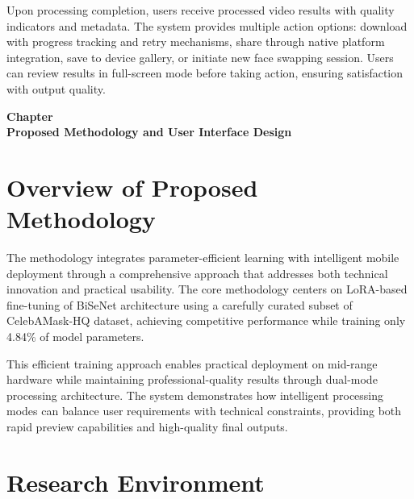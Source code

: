 \documentclass[12pt,a4paper]{report}
\begin{document}
Upon processing completion, users receive processed video results with quality indicators and metadata. The system provides multiple action options: download with progress tracking and retry mechanisms, share through native platform integration, save to device gallery, or initiate new face swapping session. Users can review results in full-screen mode before taking action, ensuring satisfaction with output quality.

\newpage
\clearpage
\thispagestyle{empty}  %
\vspace*{\fill}
\begin{center}
{\Huge\bfseries Chapter \thechapter}\\[30pt]
{\Huge\bfseries Proposed Methodology and User Interface Design}
\end{center}
\vspace*{\fill}
\label{ch:methodology}
\clearpage
\newpage

\section{Overview of Proposed Methodology}

The methodology integrates parameter-efficient learning with intelligent mobile deployment through a comprehensive approach that addresses both technical innovation and practical usability. The core methodology centers on LoRA-based fine-tuning of BiSeNet architecture using a carefully curated subset of CelebAMask-HQ dataset, achieving competitive performance while training only 4.84\% of model parameters.

This efficient training approach enables practical deployment on mid-range hardware while maintaining professional-quality results through dual-mode processing architecture. The system demonstrates how intelligent processing modes can balance user requirements with technical constraints, providing both rapid preview capabilities and high-quality final outputs.

\section{Research Environment}
\end{document}
